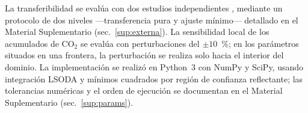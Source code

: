 La transferibilidad se evalúa con dos estudios independientes \parencite{ermolaevGreenhouseGasEmissions2019,schonUsingGasExchange2026}, mediante un protocolo de dos niveles ---transferencia pura y ajuste mínimo--- detallado en el Material Suplementario (sec.~\ref{sup:externa}). La sensibilidad local de los acumulados de CO$_2$ se evalúa con perturbaciones del $\pm 10$~\%; en los parámetros situados en una frontera, la perturbación se realiza solo hacia el interior del dominio. La implementación se realizó en Python~3 con NumPy y SciPy, usando integración LSODA y mínimos cuadrados por región de confianza reflectante; las tolerancias numéricas y el orden de ejecución se documentan en el Material Suplementario (sec.~\ref{sup:params}).
